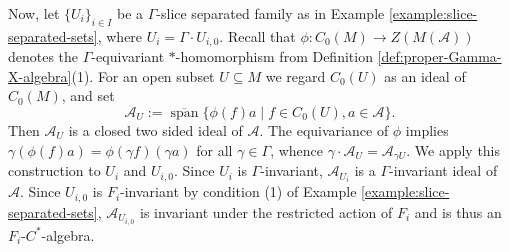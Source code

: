 \documentclass[pdflatex]{sn-jnl}
\theoremstyle{plain}
\theoremstyle{definition}
\begin{document}
Now, let $\{U_i\}_{i\in I}$ be a $\Gamma$-slice separated family as in Example \ref{example:slice-separated-sets}, where $U_i=\Gamma\cdot U_{i,0}$. Recall that $\phi:C_0(M)\to Z(M(\mathcal{A}))$ denotes the $\Gamma$-equivariant $*$-homomorphism from Definition \ref{def:proper-Gamma-X-algebra}(1). For an open subset $U\subseteq M$ we regard $C_0(U)$ as an ideal of $C_0(M)$, and set 
$$\mathcal{A}_U:=\overline{\operatorname{span}}\{\phi(f)a\mid f\in C_0(U), a \in\mathcal{A}\}.$$ 
Then $\mathcal{A}_U$ is a closed two sided ideal of $\mathcal{A}$. The equivariance of $\phi$ implies $\gamma(\phi(f)a)=\phi(\gamma f)(\gamma a)$ for all $\gamma\in\Gamma$, whence $\gamma\cdot\mathcal{A}_U=\mathcal{A}_{\gamma U}$. We apply this construction to $U_i$ and $U_{i,0}$. Since $U_i$ is $\Gamma$-invariant, $\mathcal{A}_{U_i}$ is a $\Gamma$-invariant ideal of $\mathcal{A}$. Since $U_{i,0}$ is $F_i$-invariant by condition (1) of Example \ref{example:slice-separated-sets}, $\mathcal{A}_{U_{i,0}}$ is invariant under the restricted action of $F_i$ and is thus an $F_i$-$C^*$-algebra. 
\end{document}
